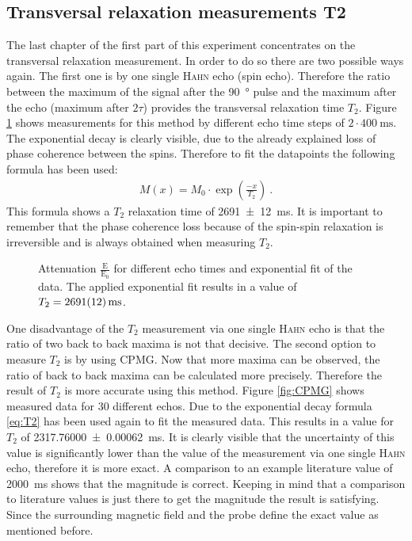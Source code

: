\subsection{Transversal relaxation measurements T2}
\label{sec:Transversalrelaxationmeasurements}
The last chapter of the first part of this experiment concentrates on the transversal relaxation measurement.
In order to do so there are two possible ways again.\newline
The first one is by one single \textsc{Hahn} echo (spin echo).
Therefore the ratio between the maximum of the signal after the \SI{90}{\degree} pulse and the maximum after the echo (maximum after $2\tau$) provides the transversal relaxation time $T_2$.
Figure \ref{fig:T2} shows measurements for this method by different echo time steps of $2\cdot \SI{400}{\milli \second}$.
The exponential decay is clearly visible, due to the already explained loss of phase coherence between the spins.
Therefore to fit the datapoints the following formula has been used:
\begin{align}
    M(x)=M_0 \cdot \exp\left(\frac{-x}{T_{2}}\right) \ .
 \label{eq:T2}
\end{align}
This formula shows a $T_2$ relaxation time of \SI{2691 \pm 12}{\milli \second}.
It is important to remember that the phase coherence loss because of the spin-spin relaxation is irreversible and is always obtained when measuring $T_2$.

\begin{figure}[H]
    \centering
    
    \caption[Attenuation $\frac{\text{E}}{\text{E}_0}$ for different echo times and exponential fit of the data.]{Attenuation $\frac{\text{E}}{\text{E}_0}$ for different echo times and exponential fit of the data.
    The applied exponential fit results in a value of $T_2 = \SI{2691 \pm 12}{\milli \second}$.}
    \label{fig:T2}
\end{figure}

One disadvantage of the $T_2$ measurement via one single \textsc{Hahn} echo is that the ratio of two back to back maxima is not that decisive.
The second option to measure $T_2$ is by using CPMG. Now that more maxima can be observed, the ratio of back to back maxima can be calculated more precisely.
Therefore the result of $T_2$ is more accurate using this method.
Figure \ref{fig:CPMG} shows measured data for 30 different echos.
Due to the exponential decay formula \eqref{eq:T2} has been used again to fit the measured data.
This results in a value for $T_2$ of \SI{2317.76000 \pm 0.00062}{\milli \second}.
It is clearly visible that the uncertainty of this value is significantly lower than the value of the measurement via one single \textsc{Hahn} echo, therefore it is more exact.
A comparison to an example literature value of \SI{2000}{\milli \second} \cite{literaturT1} shows that the magnitude is correct.
Keeping in mind that a comparison to literature values is just there to get the magnitude the result is satisfying.
Since the surrounding magnetic field and the probe define the exact value as mentioned before.

